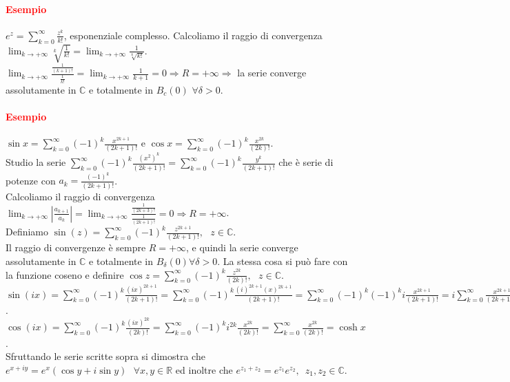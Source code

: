 \documentclass{article}
\newcommand{\R}{\mathbb{R}}
\newcommand{\C}{\mathbb{C}}
\begin{document}
\paragraph{\textcolor{red}{Esempio}}
$e^z=\sum_{k=0}^{\infty}\frac{z^k}{k!}$, esponenziale complesso. Calcoliamo il raggio di convergenza\\ $\lim_{k\rightarrow+\infty}\sqrt[k]{\frac{1}{k!}}=\lim_{k\rightarrow+\infty}\frac{1}{\sqrt[k]{k!}}$. $\lim_{k\rightarrow+\infty}\frac{\frac{1}{(k+1)!}}{\frac{1}{k!}}=\lim_{k\rightarrow+\infty}\frac{1}{k+1}=0\Rightarrow R=+\infty \Rightarrow$ la serie converge assolutamente in $\C$ e totalmente in $B_c(0) \,\, \forall \delta>0$.

\paragraph{\textcolor{red}{Esempio}}
$\sin x =\sum_{k=0}^{\infty}(-1)^k\frac{x^{2k+1}}{(2k+1)!}$ e
$\cos x =\sum_{k=0}^{\infty}(-1)^k\frac{x^{2k}}{(2k)!}$.\\
Studio la serie $\sum_{k=0}^{\infty}(-1)^k\frac{(x^2)^{k}}{(2k+1)!}=\sum_{k=0}^{\infty}(-1)^k\frac{y^k}{(2k+1)!}$ che è serie di potenze con $a_k=\frac{(-1)^k}{(2k+1)!}$.\\ Calcoliamo il raggio di convergenza $\lim_{k\rightarrow +\infty}|\frac{a_{k+1}}{a_k}|=\lim_{k\rightarrow+\infty}\frac{\frac{1}{(2k+3)!}}{\frac{1}{(2k+1)!}}=0\Rightarrow R=+\infty$.\\
Definiamo $\sin(z)=\sum_{k=0}^{\infty}(-1)^k\frac{z^{2k+1}}{(2k+1)!},\,\,\,\, z \in \C$.\\
Il raggio di convergenze è sempre $R=+\infty$, e quindi la serie converge assolutamente in $\C$ e totalmente in $B_\delta(0)\forall \delta >0$. La stessa cosa si può fare con la funzione coseno e definire $\cos z=\sum_{k=0}^{\infty}(-1)^k\frac{z^{2k}}{(2k)!},\,\,\,\, z \in \C$.\\
$\sin(ix)=\sum_{k=0}^{\infty}(-1)^k\frac{(ix)^{2k+1}}{(2k+1)!}=\sum_{k=0}^{\infty}(-1)^k\frac{(i)^{2k+1}(x)^{2k+1}}{(2k+1)!}=\sum_{k=0}^{\infty}(-1)^k(-1)^ki\frac{x^{2k+1}}{(2k+1)!}=i\sum_{k=0}^{\infty}\frac{x^{2k+1}}{(2k+1)!}=i\sinh x$.\\
$\cos(ix)=\sum_{k=0}^{\infty}(-1)^k \frac{(ix)^{2k}}{(2k)!}=\sum_{k=0}^{\infty}(-1)^k i^{2k} \frac{x^{2k}}{(2k)!}=\sum_{k=0}^{\infty}\frac{x^{2k}}{(2k)!}=\cosh x$.\\
Sfruttando le serie scritte sopra si dimostra che $e^{x+iy}=e^x(\cos y + i \sin y) \,\,\,\, \forall x,y\in \R$ ed inoltre che $e^{z_1+z_2}=e^{z_1}e^{z_2},\,\,\, z_1,z_2 \in \C$.
\end{document}
